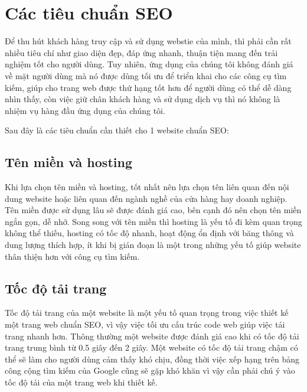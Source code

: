 \chapter{Các tiêu chuẩn SEO}
Để thu hút khách hàng truy cập và sử dụng webstie của mình, thì phải cần rất nhiều tiêu chí như giao diện đẹp, đáp ứng nhanh, thuận tiện mang đến trải nghiệm tốt cho người dùng. Tuy nhiên, ứng dụng của chúng tôi không đánh giá về mặt người dùng mà nó được dùng tối ưu để triển khai cho các công cụ tìm kiếm, giúp cho trang web được thứ hạng tốt hơn để người dùng có thể dễ dàng nhìn thấy, còn việc giữ chân khách hàng và sử dụng dịch vụ thì nó không là nhiệm vụ hàng đầu ứng dụng của chúng tôi.
\par
Sau đây là các tiêu chuẩn cần thiết cho 1 website chuẩn SEO\cite{seo}:
\section{Tên miền và hosting}
Khi lựa chọn tên miền và hosting, tốt nhất nên lựa chọn tên liên quan đến nội dung website hoặc liên quan đến ngành nghề của cửa hàng hay doanh nghiệp. Tên miền được sử dụng lâu sẽ được đánh giá cao, bên cạnh đó nên chọn tên miền ngắn gọn, dễ nhớ. Song song với tên miền thì hosting là yếu tố đi kèm quan trọng không thể thiếu, hosting có tốc độ nhanh, hoạt động ổn định với băng thông và dung lượng thích hợp, ít khi bị gián đoạn là một trong những yếu tố giúp website thân thiện hơn với công cụ tìm kiếm.
\section{Tốc độ tải trang}
Tốc độ tải trang của một website  là một yếu tố quan trọng trong việc thiết kế một trang web chuẩn SEO, vì vậy việc tối ưu cấu trúc code web giúp việc tải trang nhanh hơn. Thông thường một website được đánh giá cao khi có tốc độ tải trang trung bình từ 0.5 giây đến 2 giây. Một website có tốc độ tải trang chậm có thể sẽ làm cho người dùng cảm thấy khó chịu, đồng thời việc xếp hạng trên bảng công cộng tìm kiếm của Google cũng sẽ gặp khó khăn vì vậy cần phải chú ý vào tốc độ tải của một trang web khi thiết kế.
